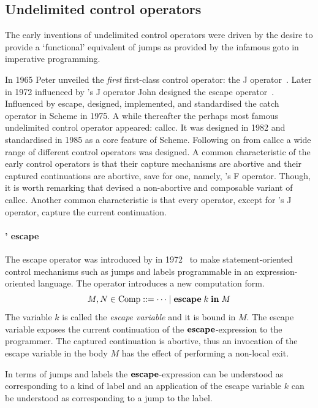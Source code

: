 \documentclass[12pt,phd,lfcs,twoside,openright,logo,leftchapter,normalheadings]{infthesis}
\theoremstyle{plain}
\theoremstyle{definition}
\begin{document}
\subsection{Undelimited control operators}
%
The early inventions of undelimited control operators were driven by
the desire to provide a `functional' equivalent of jumps as provided
by the infamous goto in imperative programming.
%

In 1965 Peter \citeauthor{Landin65} unveiled the \emph{first}
first-class control operator: the J
operator~\cite{Landin65,Landin65a,Landin98}. Later in 1972 influenced
by \citeauthor{Landin65}'s J operator John \citeauthor{Reynolds98a}
designed the escape operator~\cite{Reynolds98a}. Influenced by escape,
\citeauthor{SussmanS75} designed, implemented, and standardised the
catch operator in Scheme in 1975. A while thereafter the perhaps most
famous undelimited control operator appeared: callcc. It was designed
in 1982 and standardised in 1985 as a core feature of
Scheme. Following on from callcc a wide range of different control
operators was designed. A common characteristic of the early control
operators is that their capture mechanisms are abortive and their
captured continuations are abortive, save for one, namely,
\citeauthor{Felleisen88}'s F operator. Though, it is worth remarking
that \citet{FlattYFF07} devised a non-abortive and composable variant
of callcc. Another common characteristic is that every operator,
except for \citeauthor{Landin98}'s J operator, capture the current
continuation.

\paragraph{\citeauthor{Reynolds98a}' escape} The escape operator was introduced by
\citeauthor{Reynolds98a} in 1972~\cite{Reynolds98a} to make
statement-oriented control mechanisms such as jumps and labels
programmable in an expression-oriented language.
%
The operator introduces a new computation form.
%
\[
  M, N \in \textrm{Comp} ::= \cdots \mid \mathbf{escape}\;k\;\mathbf{in}\;M
\]
%
The variable $k$ is called the \emph{escape variable} and it is bound
in $M$. The escape variable exposes the current continuation of the
$\mathbf{escape}$-expression to the programmer. The captured continuation is
abortive, thus an invocation of the escape variable in the body $M$
has the effect of performing a non-local exit.
%

In terms of jumps and labels the $\mathbf{escape}$-expression can be
understood as corresponding to a kind of label and an application of
the escape variable $k$ can be understood as corresponding to a jump
to the label.
\end{document}
